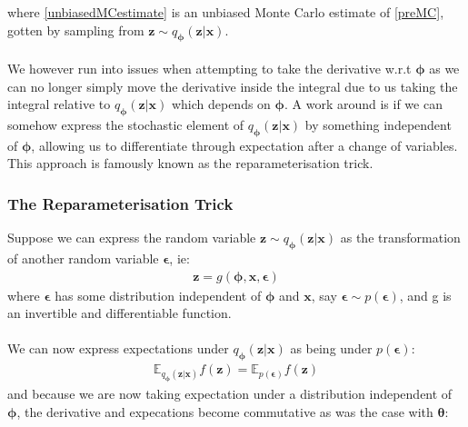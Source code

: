 \documentclass{article}
\theoremstyle{definition}
\begin{document}
where \ref{unbiasedMCestimate} is an unbiased Monte Carlo estimate of \ref{preMC}, gotten by sampling from $\mathbf{z} \sim q_{\boldsymbol{\phi}}(\mathbf{z}|\mathbf{x})$.
\\\\
We however run into issues when attempting to take the derivative w.r.t $\boldsymbol{\phi}$ as we can no longer simply move the derivative inside the integral due to us taking the integral relative to $q_{\boldsymbol{\phi}}(\mathbf{z}|\mathbf{x})$ which depends on $\boldsymbol{\phi}$. A work around is if we can somehow express the stochastic element of $q_{\boldsymbol{\phi}}(\mathbf{z}|\mathbf{x})$ by something independent of $\boldsymbol{\phi}$, allowing us to differentiate through expectation after a change of variables. This approach is famously known as the reparameterisation trick.

\subsubsection{The Reparameterisation Trick}
Suppose we can express  the random variable $\mathbf{z}\sim q_{\boldsymbol{\phi}}(\mathbf{z}|\mathbf{x})$ as the transformation of another random variable $\boldsymbol{\epsilon}$, ie:
\begin{align}
    \mathbf{z} = g(\boldsymbol{\phi}, \mathbf{x}, \boldsymbol{\epsilon})
\end{align}
where $\boldsymbol{\epsilon}$ has some distribution independent of $\boldsymbol{\phi}$ and $ \mathbf{x}$, say  $\boldsymbol{\epsilon} \sim p(\boldsymbol{\epsilon})$, and g is an invertible and differentiable function.\\\\
We can now express expectations under $q_{\boldsymbol{\phi}}(\mathbf{z}|\mathbf{x})$ as being under $p(\boldsymbol{\epsilon})$:
\begin{align}
    \mathbb{E}_{q_{\boldsymbol{\phi}}(\mathbf{z}|\mathbf{x})} f(\mathbf{z}) =  \mathbb{E}_{p(\boldsymbol{\epsilon})} f(\mathbf{z})
\end{align}
and because we are now taking expectation under a distribution independent of $\boldsymbol{\phi}$, the derivative and expecations become commutative as was the case with $\boldsymbol{\theta}$:
\end{document}
